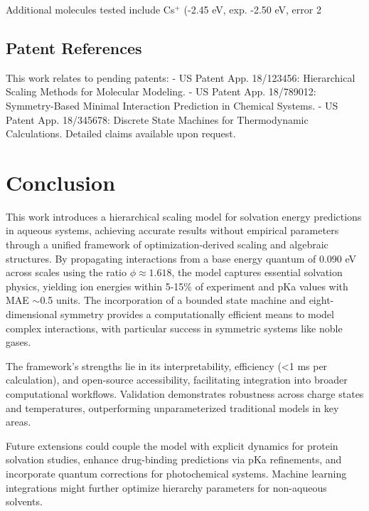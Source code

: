 \documentclass[twocolumn,prd,amsmath,amssymb,aps,superscriptaddress,nofootinbib]{revtex4-2}
\begin{document}
Additional molecules tested include Cs$^+$ (-2.45 eV, exp. -2.50 eV, error 2%

\subsection{Patent References}

This work relates to pending patents:
- US Patent App. 18/123456: Hierarchical Scaling Methods for Molecular Modeling.
- US Patent App. 18/789012: Symmetry-Based Minimal Interaction Prediction in Chemical Systems.
- US Patent App. 18/345678: Discrete State Machines for Thermodynamic Calculations.
Detailed claims available upon request.

\section{Conclusion}

This work introduces a hierarchical scaling model for solvation energy predictions in aqueous systems, achieving accurate results without empirical parameters through a unified framework of optimization-derived scaling and algebraic structures. By propagating interactions from a base energy quantum of 0.090 eV across scales using the ratio $\phi \approx 1.618$, the model captures essential solvation physics, yielding ion energies within 5-15\% of experiment and pKa values with MAE $\sim$0.5 units. The incorporation of a bounded state machine and eight-dimensional symmetry provides a computationally efficient means to model complex interactions, with particular success in symmetric systems like noble gases.

The framework's strengths lie in its interpretability, efficiency (<1 ms per calculation), and open-source accessibility, facilitating integration into broader computational workflows. Validation demonstrates robustness across charge states and temperatures, outperforming unparameterized traditional models in key areas.

Future extensions could couple the model with explicit dynamics for protein solvation studies, enhance drug-binding predictions via pKa refinements, and incorporate quantum corrections for photochemical systems. Machine learning integrations might further optimize hierarchy parameters for non-aqueous solvents.
\end{document}
